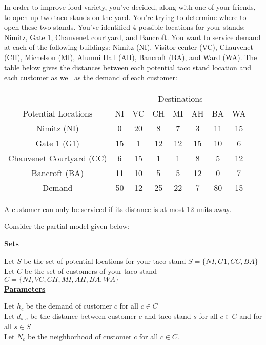\documentclass[12pt]{exam}
\begin{document}
\begin{questions}
\begin{parts}
\end{parts}



\newpage
\question In order to improve food variety, you've decided, along with one of your friends, to open up two taco stands on the yard. You're trying to determine where to open these two stands. You've identified 4 possible locations for your stands: Nimitz, Gate 1, Chauvenet courtyard, and Bancroft. You want to service demand at each of the following buildings: Nimitz (NI), Visitor center (VC), Chauvenet (CH), Michelson (MI), Alumni Hall (AH), Bancroft (BA), and Ward (WA). The table below gives the distances between each potential taco stand location and each customer as well as the demand of each customer:

\begin{center}
\begin{tabular}{c|ccccccc}
\hline
                          & \multicolumn{7}{c}{Destinations}  \\
Potential Locations       &  NI & VC & CH & MI & AH & BA & WA \\ \hline
 Nimitz (NI)              &  0  & 20 & 8  & 7  & 3  & 11 & 15  \\
 Gate 1 (G1)              &  15 & 1  & 12 & 12 & 15 & 10 & 6   \\
 Chauvenet Courtyard (CC) &  6  & 15 & 1  & 1  & 8  & 5  & 12 \\
 Bancroft (BA)            &  11 & 10 & 5  & 5  & 12 & 0  & 7 \\ \hline
 Demand                   &  50 & 12 & 25 & 22 & 7  & 80 & 15 \\
\end{tabular}
\end{center}

A customer can only be serviced if its distance is at most 12 units away.

Consider the partial model given below:

\textbf{\underline{Sets}}

Let $S$ be the set of potential locations for your taco stand $S = \{NI, G1, CC, BA\}$ \\
Let $C$ be the set of customers of your taco stand $C = \{NI, VC, CH, MI, AH, BA, WA\}$\\

\textbf{\underline{Parameters}}

Let $h_c$ be the demand of customer $c$ for all $c \in C$ \\
Let $d_{s,c}$ be the distance between customer $c$ and taco stand $s$ for all $c \in C$ and for all $s \in S$\\
Let $N_c$ be the neighborhood of customer $c$ for all $c \in C$.


\end{questions}
\end{document}
